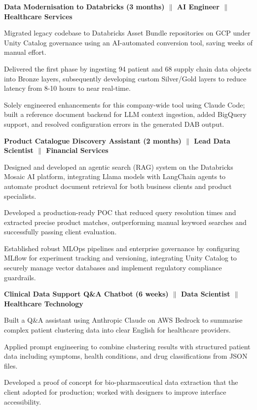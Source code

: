 

{\textbf{Data Modernisation to Databricks (3 months) $\|$ AI Engineer $\|$ Healthcare Services}}
\begin{zitemize}
\item Migrated legacy codebase to Databricks Asset Bundle repositories on GCP under Unity Catalog governance using an AI-automated conversion tool, saving weeks of manual effort.

\item Delivered the first phase by ingesting 94 patient and 68 supply chain data objects into Bronze layers, subsequently developing custom Silver/Gold layers to reduce latency from 8-10 hours to near real-time.

\item Solely engineered enhancements for this company-wide tool using Claude Code; built a reference document backend for LLM context ingestion, added BigQuery support, and resolved configuration errors in the generated DAB output.
\end{zitemize}

{\textbf{Product Catalogue Discovery Assistant (2 months) $\|$ Lead Data Scientist $\|$ Financial Services}}
\begin{zitemize}
\item Designed and developed an agentic search (RAG) system on the Databricks Mosaic AI platform, integrating Llama models with LangChain agents to automate product document retrieval for both business clients and product specialists.

\item Developed a production-ready POC that reduced query resolution times and extracted precise product matches, outperforming manual keyword searches and successfully passing client evaluation.

\item Established robust MLOps pipelines and enterprise governance by configuring MLflow for experiment tracking and versioning, integrating Unity Catalog to securely manage vector databases and implement regulatory compliance guardrails.
\end{zitemize}


{\textbf{Clinical Data Support Q\&A Chatbot (6 weeks) $\|$ Data Scientist $\|$ Healthcare Technology}}
\begin{zitemize}
\item Built a Q\&A assistant using Anthropic Claude on AWS Bedrock to summarise complex patient clustering data into clear English for healthcare providers.

\item 
Applied prompt engineering to combine clustering results with structured patient data including symptoms, health conditions,
and drug classifications from JSON files.

\item Developed a proof of concept for bio-pharmaceutical data extraction that the client adopted for production; worked with designers to improve interface accessibility.
\end{zitemize}